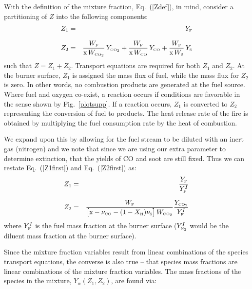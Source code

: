 \documentclass[11pt]{book}
\begin{document}
With the definition of the mixture fraction, Eq.~(\ref{Zdef}), in mind, consider a partitioning of $Z$ into the following components:
\begin{eqnarray}  Z_1 &=& Y_{\tiny \hbox{F}}  \label{Z1first}  \\*[.1in]
                  Z_2 &=& \frac{W_{\tiny \hbox{F}}}{\hbox{x} \, W_{\tiny \hbox{CO}_2} } \,  Y_{\tiny \hbox{CO}_2}  + \frac{W_{\tiny \hbox{F}}}{\hbox{x} \, W_{\tiny \hbox{CO}} } \, Y_{\tiny \hbox{CO}}  + \frac{W_{\tiny \hbox{F}}}{\hbox{x} \, W_{\tiny \hbox{S}} }  \label{Z2first} \, Y_{\tiny \hbox{S}}
\end{eqnarray}
such that $Z=Z_1+Z_2$. Transport equations are required for both $Z_1$ and $Z_2$.
At the burner surface, $Z_1$ is assigned the mass flux of fuel,
while the mass flux for $Z_2$ is zero. In other words, no combustion products are generated at the fuel source. Where fuel and
oxygen co-exist, a reaction occurs if conditions are favorable in the sense shown by Fig.~\ref{plotsupp}.
If a reaction occurs, $Z_1$ is converted to $Z_2$ representing the
conversion of fuel to products. The heat release rate of the fire is obtained by multiplying the fuel consumption rate by the
heat of combustion.

We expand upon this by allowing for the fuel stream to be diluted with an inert gas (nitrogen) and we note that since we are using our extra
parameter to determine extinction, that the yields of CO and soot are still fixed.  Thus we can restate
Eq.~(\ref{Z1first}) and Eq.~(\ref{Z2first}) as:
\begin{eqnarray} Z_1 &=& \frac{Y_{\tiny \hbox{F}}}{Y_{\tiny \hbox{F}}^I} \\*[.1in]
                 Z_2 &=& \frac{W_{\tiny \hbox{F}}}{\big[\hbox{x}-\nu_{\tiny \hbox{CO}}-(1-X_{\tiny \hbox{H}}) \nu_{\tiny \hbox{S}} \big] \, W_{\tiny \hbox{CO}_2} } \frac{Y_{\tiny \hbox{CO}_2}}{Y_{\tiny \hbox{F}}^I}
\end{eqnarray}
where $Y_{\tiny \hbox{F}}^I$ is the fuel mass fraction at the burner surface ($Y_{\tiny \hbox{N}_2}^I$ would be the diluent mass fraction at the
burner surface).

Since the mixture fraction variables result from linear combinations of the species transport equations, the converse
is also true -- that species mass fractions are linear combinations of the mixture fraction variables.
The mass fractions of the species in the mixture, $Y_{\alpha}(Z_1,Z_2)$, are found via:
\end{document}
